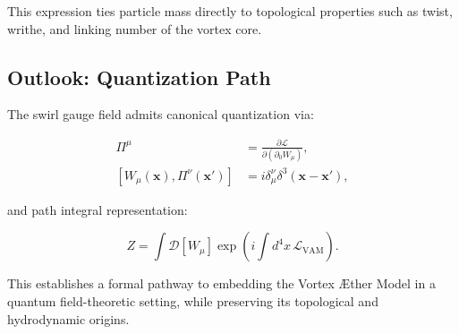 This expression ties particle mass directly to topological properties such as twist, writhe, and linking number of the vortex core.

\subsection{Outlook: Quantization Path}

The swirl gauge field admits canonical quantization via:

\begin{align}
\Pi^\mu &= \frac{\partial \mathcal{L}}{\partial (\partial_0 W_\mu)}, \\
[W_\mu(\mathbf{x}), \Pi^\nu(\mathbf{x}')] &= i \delta^\nu_\mu \delta^3(\mathbf{x} - \mathbf{x}'),
\end{align}

and path integral representation:

\begin{equation}
Z = \int \mathcal{D}[W_\mu] \exp\left(i \int d^4x \, \mathcal{L}_{\text{VAM}}\right).
\end{equation}

This establishes a formal pathway to embedding the Vortex Æther Model in a quantum field-theoretic setting, while preserving its topological and hydrodynamic origins.
